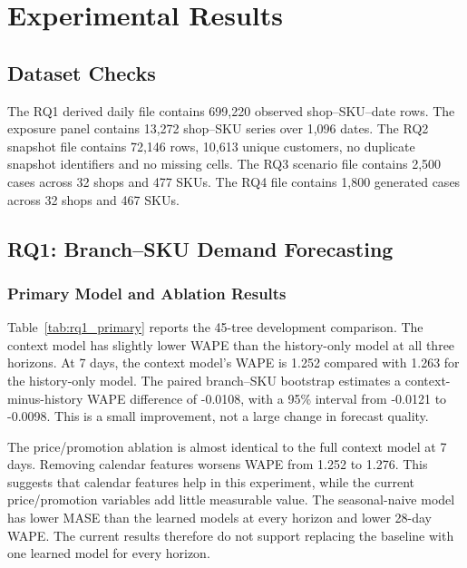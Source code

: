 \chapter{Experimental Results}
\label{chapter_experimentalResults}

\section{Dataset Checks}
The RQ1 derived daily file contains 699,220 observed shop--SKU--date rows. The exposure panel contains 13,272 shop--SKU series over 1,096 dates. The RQ2 snapshot file contains 72,146 rows, 10,613 unique customers, no duplicate snapshot identifiers and no missing cells. The RQ3 scenario file contains 2,500 cases across 32 shops and 477 SKUs. The RQ4 file contains 1,800 generated cases across 32 shops and 467 SKUs.

\section{RQ1: Branch--SKU Demand Forecasting}
\subsection{Primary Model and Ablation Results}
Table~\ref{tab:rq1_primary} reports the 45-tree development comparison. The context model has slightly lower WAPE than the history-only model at all three horizons. At 7 days, the context model's WAPE is 1.252 compared with 1.263 for the history-only model. The paired branch--SKU bootstrap estimates a context-minus-history WAPE difference of -0.0108, with a 95\% interval from -0.0121 to -0.0098. This is a small improvement, not a large change in forecast quality.

The price/promotion ablation is almost identical to the full context model at 7 days. Removing calendar features worsens WAPE from 1.252 to 1.276. This suggests that calendar features help in this experiment, while the current price/promotion variables add little measurable value. The seasonal-naive model has lower MASE than the learned models at every horizon and lower 28-day WAPE. The current results therefore do not support replacing the baseline with one learned model for every horizon.

